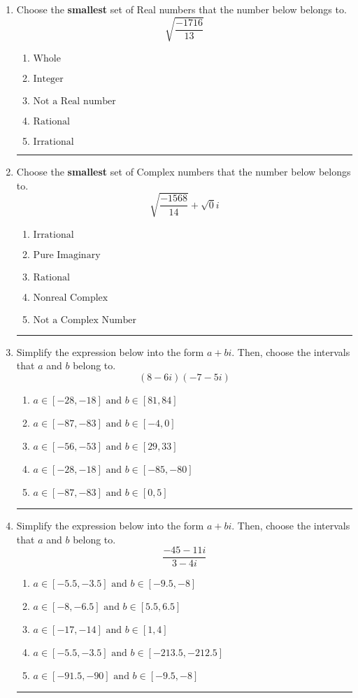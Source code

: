 \documentclass[14pt]{extbook}
\newcommand{\litem}[1]{\item#1\hspace*{-1cm}\rule{\textwidth}{0.4pt}}
\begin{document}
\begin{enumerate}
{\begin{enumerate}[label=\Alph*.]
\end{enumerate} }
\litem{
Choose the \textbf{smallest} set of Real numbers that the number below belongs to.\[ \sqrt{\frac{-1716}{13}} \]\begin{enumerate}[label=\Alph*.]
\item \( \text{Whole} \)
\item \( \text{Integer} \)
\item \( \text{Not a Real number} \)
\item \( \text{Rational} \)
\item \( \text{Irrational} \)

\end{enumerate} }
\litem{
Choose the \textbf{smallest} set of Complex numbers that the number below belongs to.\[ \sqrt{\frac{-1568}{14}}+\sqrt{0}i \]\begin{enumerate}[label=\Alph*.]
\item \( \text{Irrational} \)
\item \( \text{Pure Imaginary} \)
\item \( \text{Rational} \)
\item \( \text{Nonreal Complex} \)
\item \( \text{Not a Complex Number} \)

\end{enumerate} }
\litem{
Simplify the expression below into the form $a+bi$. Then, choose the intervals that $a$ and $b$ belong to.\[ (8 - 6 i)(-7 - 5 i) \]\begin{enumerate}[label=\Alph*.]
\item \( a \in [-28, -18] \text{ and } b \in [81, 84] \)
\item \( a \in [-87, -83] \text{ and } b \in [-4, 0] \)
\item \( a \in [-56, -53] \text{ and } b \in [29, 33] \)
\item \( a \in [-28, -18] \text{ and } b \in [-85, -80] \)
\item \( a \in [-87, -83] \text{ and } b \in [0, 5] \)

\end{enumerate} }
\litem{
Simplify the expression below into the form $a+bi$. Then, choose the intervals that $a$ and $b$ belong to.\[ \frac{-45 - 11 i}{3 - 4 i} \]\begin{enumerate}[label=\Alph*.]
\item \( a \in [-5.5, -3.5] \text{ and } b \in [-9.5, -8] \)
\item \( a \in [-8, -6.5] \text{ and } b \in [5.5, 6.5] \)
\item \( a \in [-17, -14] \text{ and } b \in [1, 4] \)
\item \( a \in [-5.5, -3.5] \text{ and } b \in [-213.5, -212.5] \)
\item \( a \in [-91.5, -90] \text{ and } b \in [-9.5, -8] \)


\end{enumerate}}
\end{enumerate}
\end{document}
